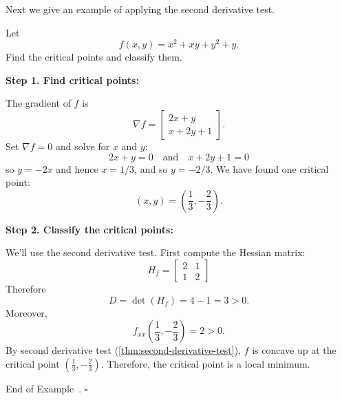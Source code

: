 \documentclass[10pt]{article}
\theoremstyle{definition}
\newtheorem{example}[theorem]{Example}
\renewenvironment{example}
{\begin{oldexample}}
  {\par\smallskip\hfill   End of Example~\theexample. $\square$    \par\end{oldexample}}
\newcommand{\vt}{\vskip 5mm} %
\newcommand{\Fl}{\vt\noindent\textbf} %
\newcommand{\1}[1]{\textbf{1}_{\left[#1\right]}} %
\begin{document}
Next we give an example of applying the second derivative test.

\begin{example}
  Let
  \begin{equation*}
    f(x,y) = x^{2}+xy+y^{2}+y.
  \end{equation*}
  Find the critical points and classify them.

  \Fl{Step 1. Find critical points:}

  The gradient of $f$ is
  \begin{equation*}
    \nabla f =
    \begin{bmatrix}
      2x+y\\x+2y+1
    \end{bmatrix}.
  \end{equation*}
  Set $\nabla f=0$ and solve for $x$ and $y$:
  \begin{equation*}
    2x+y=0 \quad \text{and} \quad x+2y+1=0
  \end{equation*}
  so $y=-2x$ and hence $x=1/3$, and so $y=-2/3$.
  We have found one critical point:
  \begin{equation*}
    (x,y) = \left(\frac{1}{3},-\frac{2}{3}\right).
  \end{equation*}

  \Fl{Step 2. Classify the critical points:}

  We'll use the second derivative test. First compute the Hessian matrix:
  \begin{equation*}
    H_{f} =
    \begin{bmatrix}
      2&1\\1&2
    \end{bmatrix}
  \end{equation*}
  Therefore
  \begin{equation*}
    D = \det(H_{f})= 4-1 = 3>0.
  \end{equation*}
  Moreover,
  \begin{equation*}
    f_{xx}\left(\frac{1}{3},-\frac{2}{3}\right) = 2>0.
  \end{equation*}
  By second derivative test (\cref{thm:second-derivative-test}), $f$ is
  concave up at the critical point $(\frac{1}{3},-\frac{2}{3})$. Therefore,
  the critical point is a local minimum.
\end{example}

\end{document}
